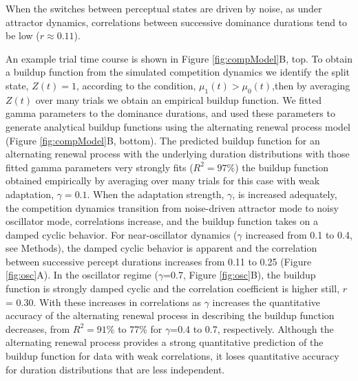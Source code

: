 When the switches between perceptual states are driven by noise, as under attractor dynamics, correlations between successive dominance durations tend to be low ($r \approx 0.11$). 

An example trial time course is shown in Figure \ref{fig:compModel}B, top. To obtain a buildup function from the simulated competition dynamics we identify the split state, $Z(t)=1$, according to the condition, $\mu_1 (t)>\mu_0  (t)$,then by averaging $Z(t)$ over many trials we obtain an empirical buildup function. We fitted gamma parameters to the dominance durations, and used these parameters to generate analytical buildup functions using the alternating renewal process model (Figure \ref{fig:compModel}B, bottom). The predicted buildup function for an alternating renewal process with the underlying duration distributions with those fitted gamma parameters very strongly fits ($R^2 = 97$\%) the buildup function obtained empirically by averaging over many trials for this case with weak adaptation, $\gamma=0.1$. When the adaptation strength, $\gamma$, is increased adequately, the competition dynamics transition from noise-driven attractor mode to noisy oscillator mode, correlations increase, and the buildup function takes on a damped cyclic behavior. For near-oscillator dynamics ($\gamma$ increased from 0.1 to 0.4, see Methods), the damped cyclic behavior is apparent and the correlation between successive percept durations increases from 0.11 to 0.25 (Figure \ref{fig:osc}A).  In the oscillator regime ($\gamma$=0.7, Figure \ref{fig:osc}B), the buildup function is strongly damped cyclic and the correlation coefficient is higher still, $r$= 0.30. With these increases in correlations as $\gamma$ increases the quantitative accuracy of the alternating renewal process in describing the buildup function decreases, from $R^2 = 91$\% to 77\% for $\gamma$=0.4 to 0.7, respectively. Although the alternating renewal process provides a strong quantitative prediction of the buildup function for data with weak correlations, it loses quantitative accuracy for duration distributions that are less independent.

